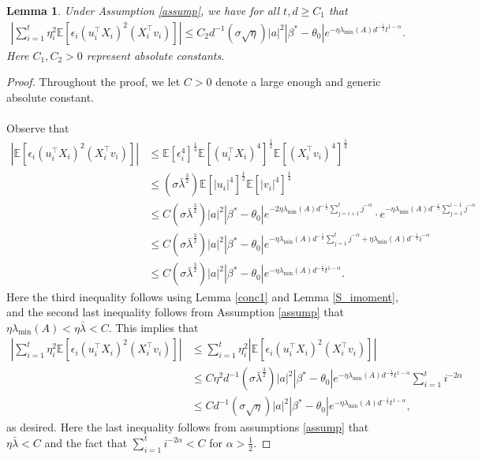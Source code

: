 \documentclass[11pt, reqno,english]{amsart}
\newtheorem{lemma}{Lemma}[section]
\begin{document}
\begin{lemma}\label{variance-non-linear-term}
Under Assumption \ref{assump}, we have for all  $t,d \geq C_1$ that
\begin{align*}
    |\sum_{i = 1}^t \eta_i^2\mathbb{E}[\epsilon_i (u_i^\top X_i)^2 (X_i^\top v_i)]| \leq C_2d^{-1}(\sigma \sqrt{\eta})|a|^2 |\beta^* - \theta_0|e^{-\eta \lambda_{\min}(A)d^{-\frac{1}{2}}t^{1-\alpha}}.
\end{align*}
Here $C_1, C_2 > 0$ represent absolute constants.
\end{lemma}
\begin{proof}
Throughout the proof, we let $C > 0$ denote a large enough and generic absolute constant.
\\\\
Observe that
\begin{align*}
 |\mathbb{E}[\epsilon_i (u_i^\top X_i)^2 (X_i^\top v_i)]| &\leq \mathbb{E}[\epsilon^4_i]^{\frac{1}{4}}  \mathbb{E}[(u_i^\top X_i)^4]^{\frac{1}{2}}\mathbb{E}[(X^\top_iv_i)^4]^{\frac{1}{4}}
 \\
 &\leq (\sigma \bar{\lambda}^{\frac{3}{2}})\mathbb{E}[|u_i|^4]^{\frac{1}{2}} \mathbb{E}[|v_i|^4]^{\frac{1}{4}}
 \\
 &\leq C(\sigma \bar{\lambda}^{\frac{3}{2}}) |a|^2 |\beta^* - \theta_0| e^{-2\eta \lambda_{\min}(A)d^{-\frac{1}{2}}\sum_{j = i+1}^t j^{-\alpha}} \cdot e^{-\eta \lambda_{\min}(A) d^{-\frac{1}{2}}\sum_{j = 1}^{i-1}j^{-\alpha}}
 \\
 &\leq C(\sigma \bar{\lambda}^{\frac{3}{2}})|a|^2|\beta^* - \theta_0|e^{-\eta \lambda_{\min}(A)d^{-\frac{1}{2}}\sum_{j = 1}^t j^{-\alpha} + \eta \lambda_{\min}(A) d^{-\frac{1}{2}}i^{-\alpha}}
 \\
 &\leq C(\sigma \bar{\lambda}^{\frac{3}{2}})|a|^2 |\beta^* - \theta_0|e^{-\eta \lambda_{\min}(A)d^{-\frac{1}{2}}t^{1-\alpha}}.
\end{align*}
Here the third inequality follows using Lemma \ref{conc1} and Lemma \ref{S_imoment}, and the second last inequality follows from Assumption \ref{assump} that $\eta \lambda_{\min}(A) < \eta \bar{\lambda}  < C$. This implies that
\begin{align*}
|\sum_{i = 1}^t \eta^2_i \mathbb{E}[\epsilon_i (u_i^\top X_i)^2 (X_i^\top v_i)]| &\leq \sum_{i = 1}^t \eta^2_i|\mathbb{E}[\epsilon_i (u^\top_i X_i)^2 (X_i^\top v_i)]|
\\
&\leq C\eta^2d^{-1}(\sigma \bar{\lambda}^{\frac{3}{2}})|a|^2 |\beta^* - \theta_0|e^{-\eta \lambda_{\min}(A)d^{-\frac{1}{2}}t^{1-\alpha}}\sum_{i = 1}^t i^{-2\alpha}
\\
&\leq Cd^{-1}(\sigma \sqrt{\eta})|a|^2 |\beta^* - \theta_0|e^{-\eta \lambda_{\min}(A)d^{-\frac{1}{2}}t^{1-\alpha}},
\end{align*}
as desired. Here the last inequality follows from assumptions \ref{assump} that $\eta \bar{\lambda} < C$ and the fact that $\sum_{i=1}^t i^{-2\alpha} < C$ for $\alpha > \frac{1}{2}$.
\end{proof}
\end{document}
